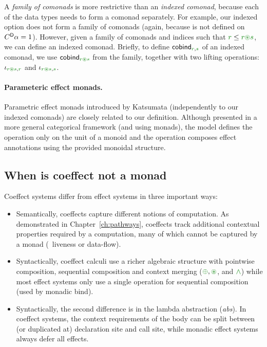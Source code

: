 \noindent
A \emph{family of comonads} is more restrictive than an \emph{indexed comonad}, because each of the data 
types needs to form a comonad separately. For example, our indexed option does not form a family of 
comonads (again, because  is not defined on $C^{\textnormal{\sffamily D}}\alpha=1$). However, given 
a family of comonads and indices such that $\cclrd{r} \leq \cclrd{r}\cseq\cclrd{s}$, we can define 
an indexed comonad. Briefly, to define $\ident{cobind}_{\cclrd{r},\cclrd{s}}$ of an indexed comonad, 
we use $\ident{cobind}_{\cclrd{r}\cseq\cclrd{s}}$ from the family, together with two lifting operations:
$\iota_{\cclrd{r}\cseq\cclrd{s}, \cclrd{r}}$ and $\iota_{\cclrd{r}\cseq\cclrd{s}, \cclrd{s}}$.

\paragraph{Parameteric effect monads.}
Parametric effect monads introduced by Katsumata \cite{monads-parametric} (independently to our 
indexed comonads) are closely related to our definition.  Although presented in a more general 
categorical framework (and using monads), the model defines the  operation only on the 
unit of a monoid and the  operation composes effect annotations using the provided monoidal 
structure.

\subsection{When is coeffect not a monad}
\label{sec:semantics-related-monad}

Coeffect systems differ from effect systems in three important ways:

\begin{itemize}
\item Semantically, coeffects capture different notions of computation. As demonstrated in 
  Chapter~\ref{ch:pathways}, coeffects track additional contextual properties required by a
  computation, many of which cannot be captured by a monad (\eg~liveness or data-flow).

\item Syntactically, coeffect calculi use a richer algebraic structure with pointwise composition,
  sequential composition and context merging ($\cpar, \cseq$, and $\czip$) while most effect systems
  only use a single operation for sequential composition (used by monadic bind).

\item Syntactically, the second difference is in the lambda abstraction (\emph{abs}). In 
  coeffect systems, the context requirements of the body can be split between (or duplicated
  at) declaration site and call site, while monadic effect systems always defer all effects.
\end{itemize}

